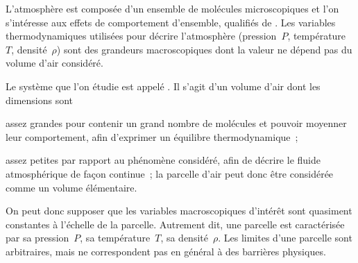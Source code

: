 \sk
L'atmosphère est composée d'un ensemble de molécules microscopiques et l'on s'intéresse aux effets de comportement d'ensemble, qualifiés de . Les variables thermodynamiques utilisées pour décrire l'atmosphère (pression~$P$, température~$T$, densité~$\rho$) sont des grandeurs macroscopiques  dont la valeur ne dépend pas du volume d'air considéré. 

\sk
Le système que l'on étudie est appelé . Il s'agit d'un volume d'air dont les dimensions sont %
\begin{citemize}
\item assez grandes pour contenir un grand nombre de molécules et pouvoir moyenner leur comportement, afin d'exprimer un équilibre thermodynamique~;
\item assez petites par rapport au phénomène considéré, afin de décrire le fluide atmosphérique de façon continue~; la parcelle d'air peut donc être considérée comme un volume élémentaire.
\end{citemize}
On peut donc supposer que les variables macroscopiques d'intérêt sont quasiment constantes à l'échelle de la parcelle. Autrement dit, une parcelle est caractérisée par sa pression~$P$, sa température~$T$, sa densité~$\rho$. Les limites d'une parcelle sont arbitraires, mais ne correspondent pas en général à des barrières physiques. 



